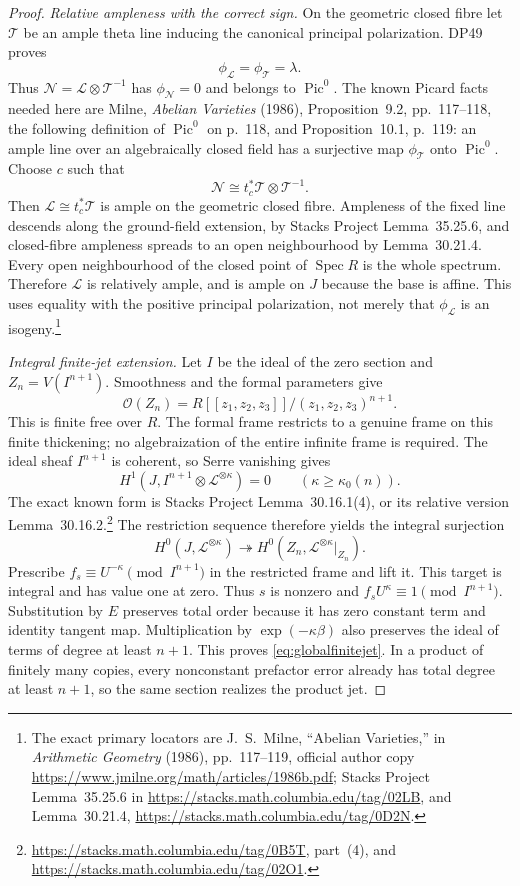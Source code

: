 \documentclass[11pt,a4paper]{article}
\theoremstyle{definition}\newtheorem{remark}[theorem]{Remark}
\begin{document}
\begin{proof}
\emph{Relative ampleness with the correct sign.}
On the geometric closed fibre let $\mathcal T$ be an ample theta line inducing the canonical principal polarization. DP49 proves
\[
 \phi_{\mathcal L}=\phi_{\mathcal T}=\lambda.
\]
Thus $\mathcal N=\mathcal L\otimes\mathcal T^{-1}$ has
$\phi_{\mathcal N}=0$ and belongs to $\operatorname{Pic}^0$.
The known Picard facts needed here are Milne, \emph{Abelian Varieties} (1986), Proposition~9.2, pp.~117--118, the following definition of $\operatorname{Pic}^0$ on p.~118, and Proposition~10.1, p.~119: an ample line over an algebraically closed field has a surjective map $\phi_{\mathcal T}$ onto $\operatorname{Pic}^0$.
Choose $c$ such that
\[
 \mathcal N\cong t_c^*\mathcal T\otimes\mathcal T^{-1}.
\]
Then $\mathcal L\cong t_c^*\mathcal T$ is ample on the geometric closed fibre.
Ampleness of the fixed line descends along the ground-field extension, by Stacks Project Lemma~35.25.6, and closed-fibre ampleness spreads to an open neighbourhood by Lemma~30.21.4.
Every open neighbourhood of the closed point of $\operatorname{Spec}R$ is the whole spectrum. Therefore $\mathcal L$ is relatively ample, and is ample on $J$ because the base is affine. This uses equality with the positive principal polarization, not merely that $\phi_{\mathcal L}$ is an isogeny.\footnote{The exact primary locators are J.~S.~Milne, ``Abelian Varieties,'' in \emph{Arithmetic Geometry} (1986), pp.~117--119, official author copy \url{https://www.jmilne.org/math/articles/1986b.pdf}; Stacks Project Lemma~35.25.6 in \url{https://stacks.math.columbia.edu/tag/02LB}, and Lemma~30.21.4, \url{https://stacks.math.columbia.edu/tag/0D2N}.}

\emph{Integral finite-jet extension.}
Let $I$ be the ideal of the zero section and $Z_n=V(I^{n+1})$.
Smoothness and the formal parameters give
\[
 \mathcal O(Z_n)
 =R[[z_1,z_2,z_3]]/(z_1,z_2,z_3)^{n+1}.
\]
This is finite free over $R$. The formal frame restricts to a genuine frame on this finite thickening; no algebraization of the entire infinite frame is required.
The ideal sheaf $I^{n+1}$ is coherent, so Serre vanishing gives
\[
 H^1(J,I^{n+1}\otimes\mathcal L^{\otimes\kappa})=0
 \qquad(\kappa\ge\kappa_0(n)).
\]
The exact known form is Stacks Project Lemma~30.16.1(4), or its relative version Lemma~30.16.2.\footnote{\url{https://stacks.math.columbia.edu/tag/0B5T}, part~(4), and \url{https://stacks.math.columbia.edu/tag/02O1}.}
The restriction sequence therefore yields the integral surjection
\[
 H^0(J,\mathcal L^{\otimes\kappa})
 \twoheadrightarrow
 H^0(Z_n,\mathcal L^{\otimes\kappa}|_{Z_n}).
\]
Prescribe $f_s\equiv U^{-\kappa}\pmod{I^{n+1}}$ in the restricted frame and lift it. This target is integral and has value one at zero. Thus $s$ is nonzero and
$f_sU^\kappa\equiv1\pmod{I^{n+1}}$.
Substitution by $E$ preserves total order because it has zero constant term and identity tangent map. Multiplication by $\exp(-\kappa\beta)$ also preserves the ideal of terms of degree at least $n+1$. This proves \eqref{eq:globalfinitejet}.
In a product of finitely many copies, every nonconstant prefactor error already has total degree at least $n+1$, so the same section realizes the product jet.


\end{proof}
\end{document}
